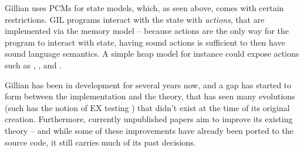 Gillian uses PCMs for state models, which, as seen above, comes with certain restrictions. GIL programs interact with the state with \emph{actions}, that are implemented via the memory model -- because actions are the only way for the program to interact with state, having sound actions is sufficient to then have sound language semantics. A simple heap model for instance could expose actions such as , ,  and .

Gillian has been in development for several years now, and a gap has started to form between the implementation and the theory, that has seen many evolutions (such has the notion of EX testing \cite{exactsl}) that didn't exist at the time of its original creation. Furthermore, currently unpublished papers aim to improve its existing theory -- and while some of these improvements have already been ported to the source code, it still carries much of its past decisions.



